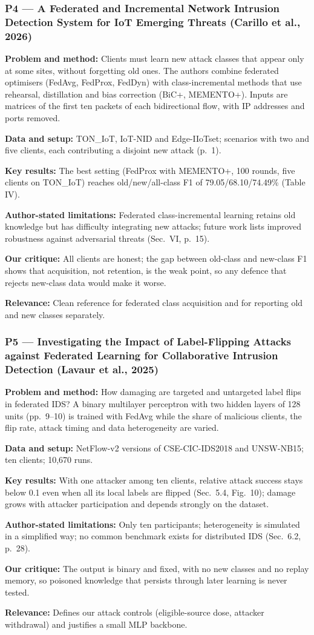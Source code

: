 \documentclass[10pt,a4paper]{article}
\newcommand{\sumitem}[2]{\noindent\textbf{#1:} #2\par}
\begin{document}
\subsubsection*{P4 --- A Federated and Incremental Network Intrusion Detection System for IoT Emerging Threats (Carillo et al., 2026)}
\sumitem{Problem and method}{Clients must learn new attack classes that appear only at some sites, without forgetting old ones. The authors combine federated optimisers (FedAvg, FedProx, FedDyn) with class-incremental methods that use rehearsal, distillation and bias correction (BiC+, MEMENTO+). Inputs are matrices of the first ten packets of each bidirectional flow, with IP addresses and ports removed.}
\sumitem{Data and setup}{TON\_IoT, IoT-NID and Edge-IIoTset; scenarios with two and five clients, each contributing a disjoint new attack (p.~1).}
\sumitem{Key results}{The best setting (FedProx with MEMENTO+, 100 rounds, five clients on TON\_IoT) reaches old/new/all-class F1 of 79.05/68.10/74.49\% (Table IV).}
\sumitem{Author-stated limitations}{Federated class-incremental learning retains old knowledge but has difficulty integrating new attacks; future work lists improved robustness against adversarial threats (Sec.~VI, p.~15).}
\sumitem{Our critique}{All clients are honest; the gap between old-class and new-class F1 shows that acquisition, not retention, is the weak point, so any defence that rejects new-class data would make it worse.}
\sumitem{Relevance}{Clean reference for federated class acquisition and for reporting old and new classes separately.}

\subsubsection*{P5 --- Investigating the Impact of Label-Flipping Attacks against Federated Learning for Collaborative Intrusion Detection (Lavaur et al., 2025)}
\sumitem{Problem and method}{How damaging are targeted and untargeted label flips in federated IDS? A binary multilayer perceptron with two hidden layers of 128 units (pp.~9--10) is trained with FedAvg while the share of malicious clients, the flip rate, attack timing and data heterogeneity are varied.}
\sumitem{Data and setup}{NetFlow-v2 versions of CSE-CIC-IDS2018 and UNSW-NB15; ten clients; 10,670 runs.}
\sumitem{Key results}{With one attacker among ten clients, relative attack success stays below 0.1 even when all its local labels are flipped (Sec.~5.4, Fig.~10); damage grows with attacker participation and depends strongly on the dataset.}
\sumitem{Author-stated limitations}{Only ten participants; heterogeneity is simulated in a simplified way; no common benchmark exists for distributed IDS (Sec.~6.2, p.~28).}
\sumitem{Our critique}{The output is binary and fixed, with no new classes and no replay memory, so poisoned knowledge that persists through later learning is never tested.}
\sumitem{Relevance}{Defines our attack controls (eligible-source dose, attacker withdrawal) and justifies a small MLP backbone.}
\end{document}
